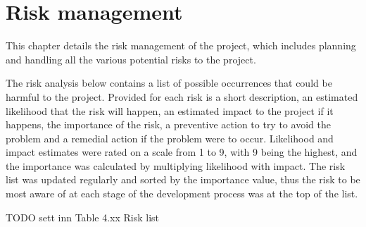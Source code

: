 
\chapter{Risk management}

This chapter details the risk management of the project, which includes planning and handling all the various potential risks to the project.\newline

The risk analysis below contains a list of possible occurrences that could be harmful to the project. Provided for each risk is a short description, an estimated likelihood that the risk will happen, an estimated impact to the project if it happens, the importance of the risk, a preventive action to try to avoid the problem and a remedial action if the problem were to occur. Likelihood and impact estimates were rated on a scale from 1 to 9, with 9 being the highest, and the importance was calculated by multiplying likelihood with impact. The risk list was updated regularly and sorted by the importance value, thus the risk to be most aware of at each stage of the development process was at the top of the list.

TODO sett inn Table 4.xx Risk list\newline

\cleardoublepage
